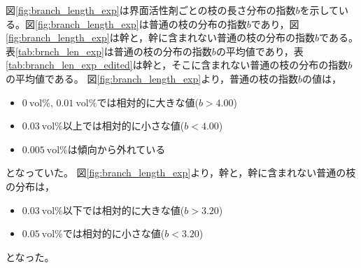 \documentclass[autodetect-engine,dvi=dvipdfmx,a4paper,ja=standard,oneside,openany,11pt]{bxjsbook}
\begin{document}
図\ref{fig:branch_length_exp}は界面活性剤ごとの枝の長さ分布の指数$b$を示している。図\ref{fig:branch_length_exp}は普通の枝の分布の指数$b$であり，図\ref{fig:branch_length_exp}は幹と，幹に含まれない普通の枝の分布の指数$b$である。表\ref{tab:brnch_len_exp}は普通の枝の分布の指数$b$の平均値であり，表\ref{tab:branch_len_exp_edited}は幹と，そこに含まれない普通の枝の分布の指数$b$の平均値である。
図\ref{fig:branch_length_exp}より，普通の枝の指数$b$の値は，
\begin{itemize}
  \item $\SI{0}{\mathrm{vol}\%}$, $\SI{0.01}{\mathrm{vol}\%}$では相対的に大きな値($b>4.00$)
  \item $\SI{0.03}{\mathrm{vol}\%}$以上では相対的に小さな値($b<4.00$)
  \item $\SI{0.005}{\mathrm{vol}\%}$は傾向から外れている
\end{itemize}
となっていた。
図\ref{fig:branch_length_exp}より，幹と，幹に含まれない普通の枝の分布は，
\begin{itemize}
  \item $\SI{0.03}{\mathrm{vol}\%}$以下では相対的に大きな値($b>3.20$)
  \item $\SI{0.05}{\mathrm{vol}\%}$では相対的に小さな値($b<3.20$)
\end{itemize}
となった。
\ifdraft{
  
  
}{}
\end{document}
